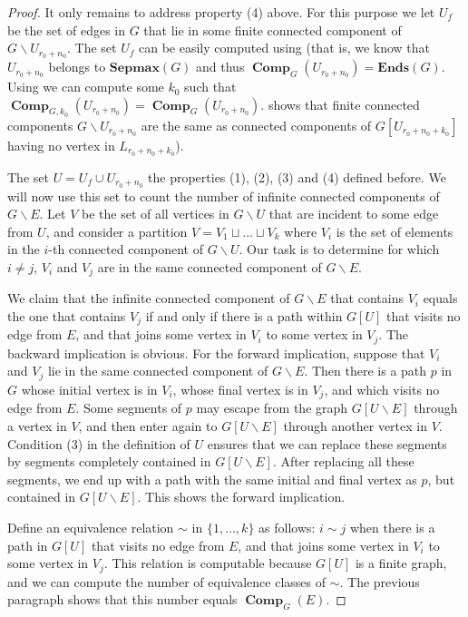 \documentclass[10pt,a4paper]{amsart}
\newcommand{\Ends}[1]{\mathbf{Ends}({#1})}
\newcommand{\comp}{\operatorname{\mathbf{Comp}}}
\newcommand{\sepmax}[1]{\mathbf{Sepmax}({#1})}
\begin{document}
\begin{proof}
    It only remains to address property (4) above. For this purpose we let $U_f$ be the set of edges in $G$ that lie in some finite connected component of $G\smallsetminus U_{r_0+n_0}$. The set $U_f$ can be easily computed using  (that is, we know that  $U_{r_0+n_0}$ belongs to $\sepmax{G}$ and thus $\comp_G(U_{r_0+n_0})=\Ends{G}$. Using  we can compute some $k_0$ such that $\comp_{G,k_0}(U_{r_0+n_0})=\comp_G(U_{r_0+n_0})$.   shows that finite  connected components  $G\smallsetminus U_{r_0+n_0}$ are the same as connected components of $G[U_{r_0+n_0+k_0}]$ having no vertex in $L_{r_0+n_0+k_0}$). 


    
      The set $U=U_f\cup U_{r_0+n_0}$ the properties (1), (2), (3) and (4) defined before. We will now use this set to count the number of infinite connected components of $G\smallsetminus E$. Let $V$ be the set of all vertices in $G\smallsetminus U$ that are incident to some edge from $U$, and consider a partition  $V=V_1\sqcup \dots \sqcup V_k$ where $V_i$ is the set of elements in the $i$-th connected component of $G\smallsetminus U$. Our task is to determine for which $i\ne j$, $V_i$ and $V_j$ are in the same connected component of $G\smallsetminus E$. 
    
    
    We claim that the infinite connected component of $G\smallsetminus E$ that contains $V_i$ equals the one that contains $V_j$ if and only if there is a path within $G[U]$ that visits no edge from $E$, and that joins some vertex in $V_i$ to some vertex in $V_j$. The backward implication is obvious. For the forward implication, suppose that $V_i$ and $V_j$ lie in the same connected component of $G\smallsetminus E$. Then there is a path $p$ in $G$ whose initial vertex is in $V_i$, whose final vertex is in $V_j$, and which visits no edge from $E$. 
    Some segments of $p$ may escape from the graph $G[U\smallsetminus E]$ through a vertex in $V$, and then enter again to $G[U\smallsetminus E]$ through another vertex in $V$. Condition (3) in the definition of $U$ ensures that we can replace these segments by segments completely contained in $G[U\smallsetminus E]$. After replacing all these segments, we end up with a path with the same initial and final vertex as $p$, but contained in $G[U\smallsetminus E]$. This shows the forward implication. 
    
    Define an equivalence relation $\sim$ in $\{1,\dots,k\}$ as follows: $i\sim j$ when there is a path in $G[U]$ that visits no edge from $E$, and that joins some vertex in $V_i$ to some vertex in $V_j$. This relation is computable because $G[U]$ is a finite graph, and we can compute the number of  equivalence classes of $\sim$. The previous paragraph shows that this number equals $\comp_G(E)$.
\end{proof} 
\end{document}
